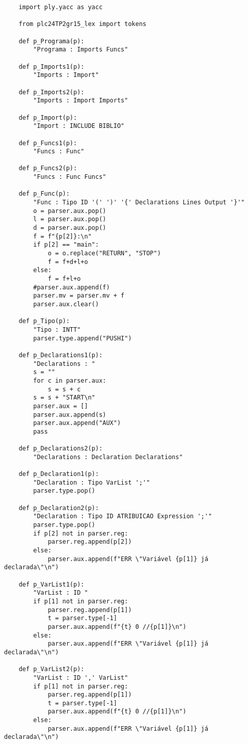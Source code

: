 \documentclass[12pt,a4paper]{report}
\begin{document}
\begin{lstlisting}
    import ply.yacc as yacc
    
    from plc24TP2gr15_lex import tokens
    
    def p_Programa(p):
        "Programa : Imports Funcs"
        
    def p_Imports1(p):
        "Imports : Import"
    
    def p_Imports2(p):
        "Imports : Import Imports"
    
    def p_Import(p):
        "Import : INCLUDE BIBLIO"
    
    def p_Funcs1(p):
        "Funcs : Func"
    
    def p_Funcs2(p):
        "Funcs : Func Funcs"
    
    def p_Func(p):
        "Func : Tipo ID '(' ')' '{' Declarations Lines Output '}'"
        o = parser.aux.pop()
        l = parser.aux.pop()
        d = parser.aux.pop()
        f = f"{p[2]}:\n"
        if p[2] == "main":
            o = o.replace("RETURN", "STOP")
            f = f+d+l+o
        else:
            f = f+l+o
        #parser.aux.append(f)
        parser.mv = parser.mv + f
        parser.aux.clear()
    
    def p_Tipo(p):
        "Tipo : INTT"
        parser.type.append("PUSHI")
    
    def p_Declarations1(p):
        "Declarations : "
        s = ""
        for c in parser.aux:
            s = s + c
        s = s + "START\n"
        parser.aux = []
        parser.aux.append(s)
        parser.aux.append("AUX")
        pass
    
    def p_Declarations2(p):
        "Declarations : Declaration Declarations"
    
    def p_Declaration1(p):
        "Declaration : Tipo VarList ';'"
        parser.type.pop()
    
    def p_Declaration2(p):
        "Declaration : Tipo ID ATRIBUICAO Expression ';'"
        parser.type.pop()
        if p[2] not in parser.reg:
            parser.reg.append(p[2])
        else:
            parser.aux.append(f"ERR \"Variável {p[1]} já declarada\"\n")
    
    def p_VarList1(p):
        "VarList : ID "
        if p[1] not in parser.reg:
            parser.reg.append(p[1])
            t = parser.type[-1]
            parser.aux.append(f"{t} 0 //{p[1]}\n")
        else:
            parser.aux.append(f"ERR \"Variável {p[1]} já declarada\"\n")
    
    def p_VarList2(p):
        "VarList : ID ',' VarList"
        if p[1] not in parser.reg:
            parser.reg.append(p[1])
            t = parser.type[-1]
            parser.aux.append(f"{t} 0 //{p[1]}\n")
        else:
            parser.aux.append(f"ERR \"Variável {p[1]} já declarada\"\n")
    

\end{lstlisting}
\end{document}
